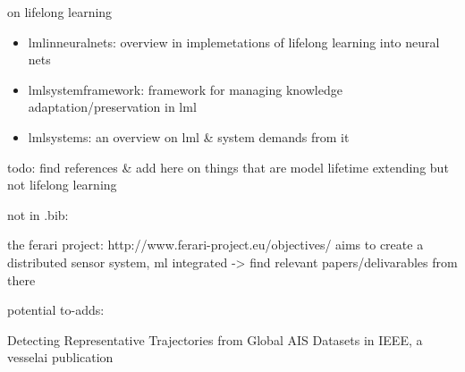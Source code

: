 \documentclass{article}
\begin{document}
on lifelong learning
\begin{itemize}
    \item \cite{lmlinneuralnets} lmlinneuralnets: overview in implemetations of lifelong learning into neural nets
    \item \cite{lmlsystemframework} lmlsystemframework: framework for managing knowledge adaptation/preservation in lml
    \item \cite{lmlsystems} lmlsystems: an overview on lml & system demands from it
\end{itemize}

todo: find references & add here on things that are model lifetime extending but not lifelong learning

not in .bib:

the ferari project: http://www.ferari-project.eu/objectives/ aims to create a distributed sensor system, ml integrated
-> find relevant papers/delivarables from there

potential to-adds:

Detecting Representative Trajectories from Global AIS Datasets in IEEE, a vesselai publication


\printbibliography
\end{document}
